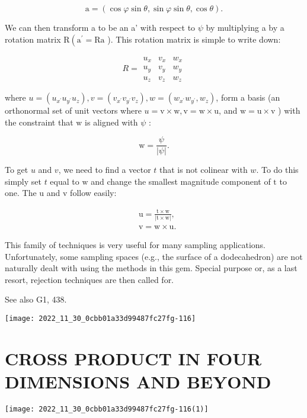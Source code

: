 \begin{CJK}{UTF8}{gbsn}
$$
\mathrm{a}=(\cos \varphi \sin \theta, \sin \varphi \sin \theta, \cos \theta) .
$$

We can then transform a to be an a' with respect to $\psi$ by multiplying a by a rotation matrix $\mathrm{R}\left(\mathrm{a}^{\prime}=\mathrm{Ra}\right.$ ). This rotation matrix is simple to write down:

$$
R=\begin{array}{lll}
u_{x} & v_{x} & w_{x} \\
u_{y} & v_{y} & w_{y} \\
u_{z} & v_{z} & w_{z}
\end{array}
$$

where $u=\left(u_{x^{\prime}} u_{y^{\prime}} u_{z}\right), v=\left(v_{x^{\prime}} v_{y^{\prime}} v_{z}\right), w=\left(w_{x^{\prime}} w_{y^{\prime}}, w_{z}\right)$, form a basis (an orthonormal set of unit vectors where $u=\mathrm{v} \times \mathrm{w}, \mathrm{v}=\mathrm{w} \times \mathrm{u}$, and $\mathrm{w}=\mathrm{u} \times \mathrm{v}$ ) with the constraint that $\mathrm{w}$ is aligned with $\psi$ :

$$
\mathrm{w}=\frac{\psi}{|\psi|} .
$$

To get $u$ and $v$, we need to find a vector $t$ that is not colinear with $w$. To do this simply set $t$ equal to $\mathrm{w}$ and change the smallest magnitude component of $\mathrm{t}$ to one. The $\mathrm{u}$ and $\mathrm{v}$ follow easily:

$$
\begin{aligned}
&\mathrm{u}=\frac{\mathrm{t} \times \mathrm{w}}{|\mathrm{t} \times \mathrm{w}|}, \\
&\mathrm{v}=\mathrm{w} \times \mathrm{u} .
\end{aligned}
$$

This family of techniques is very useful for many sampling applications. Unfortunately, some sampling spaces (e.g., the surface of a dodecahedron) are not naturally dealt with using the methods in this gem. Special purpose or, as a last resort, rejection techniques are then called for.

See also G1, 438.

\begin{center}
\texttt{[image: 2022\_11\_30\_0cbb01a33d99487fc27fg-116]}
\end{center}

\section{CROSS PRODUCT IN FOUR DIMENSIONS AND BEYOND}
\begin{center}
\texttt{[image: 2022\_11\_30\_0cbb01a33d99487fc27fg-116(1)]}
\end{center}


\end{CJK}
